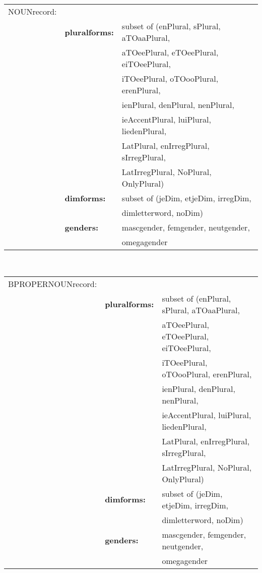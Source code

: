 \begin{tabular}{lll}
NOUNrecord:  &                 &              \\
             & {\bf pluralforms:} & subset of (enPlural, sPlural, aTOaaPlural,\\
             &                 & aTOeePlural, eTOeePlural, eiTOeePlural,    \\
             &                 & iTOeePlural, oTOooPlural, erenPlural,      \\
             &                 & ienPlural, denPlural, nenPlural,           \\
             &                 & ieAccentPlural, luiPlural, liedenPlural,   \\
             &                 & LatPlural, enIrregPlural, sIrregPlural,    \\
             &                 & LatIrregPlural, NoPlural, OnlyPlural)      \\  
             & {\bf dimforms:} & subset of (jeDim, etjeDim, irregDim, \\
             &                 & dimletterword, noDim)                \\
             & {\bf genders:}  & mascgender, femgender, neutgender,   \\
             &                 & omegagender                           \\
\end{tabular}
\\
\begin{tabular}{lll}
BPROPERNOUNrecord: &           &              \\
             & {\bf pluralforms:} & subset of (enPlural, sPlural, aTOaaPlural,\\
             &                 & aTOeePlural, eTOeePlural, eiTOeePlural,    \\
             &                 & iTOeePlural, oTOooPlural, erenPlural,      \\
             &                 & ienPlural, denPlural, nenPlural,           \\
             &                 & ieAccentPlural, luiPlural, liedenPlural,   \\
             &                 & LatPlural, enIrregPlural, sIrregPlural,    \\
             &                 & LatIrregPlural, NoPlural, OnlyPlural)      \\
             & {\bf dimforms:} & subset of (jeDim, etjeDim, irregDim, \\
             &                 & dimletterword, noDim)                \\
             & {\bf genders:}  & mascgender, femgender, neutgender,   \\
             &                 & omegagender                           \\
\end{tabular}
